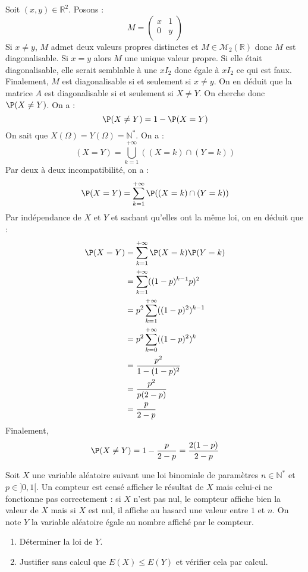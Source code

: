 \documentclass[a4paper,10pt]{report}
\begin{document}
\corr Soit $(x,y) \in \mathbb{R}^2$. Posons :
$$ M = \begin{pmatrix}
x & 1 \\
0 & y \\
\end{pmatrix}$$
Si $x \neq y$, $M$ admet deux valeurs propres distinctes et $M \in \mathcal{M}_2(\mathbb{R})$ donc $M$ est diagonalisable. Si $x=y$ alors $M$ une unique valeur propre. Si elle était diagonalisable, elle serait semblable à une $x I_2$ donc égale à $x I_2$ ce qui est faux. Finalement, $M$ est diagonalisable si et seulement si $x \ne y$. On en déduit que la matrice $A$ est diagonalisable si et seulement si $X \neq Y$. On cherche donc $\P(X \neq Y)$. On a :
$$ \P(X \neq Y) = 1 - \P(X=Y)$$
On sait que $X(\Omega)= Y(\Omega)= \mathbb{N}^*$. On a :
$$ (X=Y) = \bigcup_{k=1}^{+ \infty} ((X=k) \cap (Y=k))$$
Par deux à deux incompatibilité, on a :
$$  \P(X=Y) = \sum_{k=1}^{+ \infty} \P((X=k) \cap (Y=k))$$
Par indépendance de $X$ et $Y$ et sachant qu'elles ont la même loi, on en déduit que :
\begin{align*}
 \P(X=Y) & = \sum_{k=1}^{+ \infty} \P(X=k) \P(Y=k) \\
 & = \sum_{k=1}^{+ \infty} ((1-p)^{k-1} p)^2 \\
 & = p^2 \sum_{k=1}^{+ \infty} ((1-p)^{2})^{k-1} \\
 & = p^2 \sum_{k=0}^{+ \infty} ((1-p)^{2})^{k} \\
 & = \dfrac{p^2}{1-(1-p)^{2}}\\
 & = \dfrac{p^2}{p(2-p)} \\
 & = \dfrac{p}{2-p}
\end{align*}
Finalement,
$$ \P(X \neq Y) = 1 - \dfrac{p}{2-p} = \dfrac{2(1-p)}{2-p}$$

\begin{Exercice}{} Soit $X$ une variable aléatoire suivant une loi binomiale de paramètres $n \in \mathbb{N}^*$ et $p \in ]0,1[$. Un compteur est censé afficher le résultat de $X$ mais celui-ci ne fonctionne pas correctement : si $X$ n'est pas nul, le compteur affiche bien la valeur de $X$ mais si $X$ est nul, il affiche au hasard une valeur entre $1$ et $n$. On note $Y$ la variable aléatoire égale au nombre affiché par le compteur.

\begin{enumerate}
\item Déterminer la loi de $Y$.
\item Justifier sans calcul que $E(X) \leq E(Y)$ et vérifier cela par calcul.
\end{enumerate}
\end{Exercice}
\end{document}
